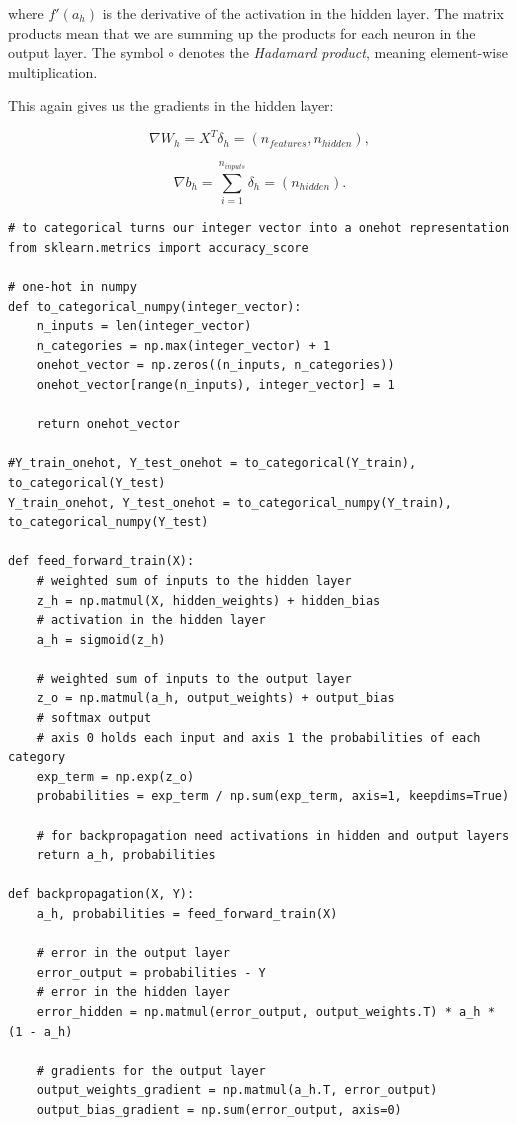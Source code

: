 \documentclass[%
oneside,                 %
final,                   %
10pt]{article}
\begin{document}
where $f'(a_{h})$ is the derivative of the activation in the hidden layer. The matrix products mean
that we are summing up the products for each neuron in the output layer. The symbol $\circ$ denotes
the \emph{Hadamard product}, meaning element-wise multiplication.  

This again gives us the gradients in the hidden layer:  

$$ \nabla W_{h} = X^T \delta_h = (n_{features}, n_{hidden}) ,$$  

$$ \nabla b_{h} = \sum_{i=1}^{n_{inputs}} \delta_h = (n_{hidden}) .$$


\begin{verbatim}
# to categorical turns our integer vector into a onehot representation
from sklearn.metrics import accuracy_score

# one-hot in numpy
def to_categorical_numpy(integer_vector):
    n_inputs = len(integer_vector)
    n_categories = np.max(integer_vector) + 1
    onehot_vector = np.zeros((n_inputs, n_categories))
    onehot_vector[range(n_inputs), integer_vector] = 1
    
    return onehot_vector

#Y_train_onehot, Y_test_onehot = to_categorical(Y_train), to_categorical(Y_test)
Y_train_onehot, Y_test_onehot = to_categorical_numpy(Y_train), to_categorical_numpy(Y_test)

def feed_forward_train(X):
    # weighted sum of inputs to the hidden layer
    z_h = np.matmul(X, hidden_weights) + hidden_bias
    # activation in the hidden layer
    a_h = sigmoid(z_h)
    
    # weighted sum of inputs to the output layer
    z_o = np.matmul(a_h, output_weights) + output_bias
    # softmax output
    # axis 0 holds each input and axis 1 the probabilities of each category
    exp_term = np.exp(z_o)
    probabilities = exp_term / np.sum(exp_term, axis=1, keepdims=True)
    
    # for backpropagation need activations in hidden and output layers
    return a_h, probabilities

def backpropagation(X, Y):
    a_h, probabilities = feed_forward_train(X)
    
    # error in the output layer
    error_output = probabilities - Y
    # error in the hidden layer
    error_hidden = np.matmul(error_output, output_weights.T) * a_h * (1 - a_h)
    
    # gradients for the output layer
    output_weights_gradient = np.matmul(a_h.T, error_output)
    output_bias_gradient = np.sum(error_output, axis=0)
    

\end{verbatim}
\end{document}
